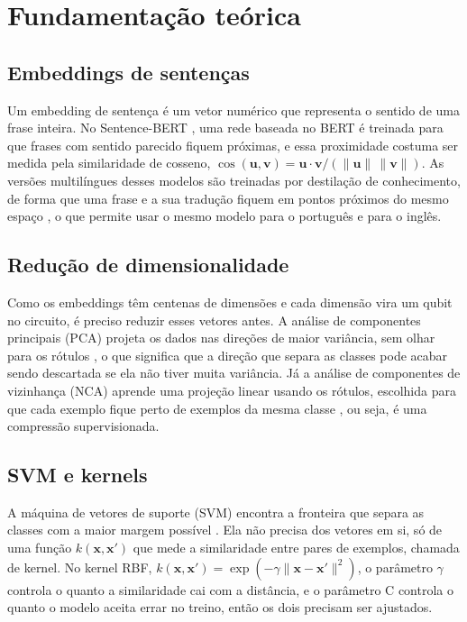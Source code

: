 \documentclass[conference]{IEEEtran}
\begin{document}
\section{Fundamentação teórica}
\label{sec:fundamentacao}

\subsection{Embeddings de sentenças}
Um embedding de sentença é um vetor numérico que representa o sentido de uma frase inteira. No Sentence-BERT \cite{reimers2019}, uma rede baseada no BERT é treinada para que frases com sentido parecido fiquem próximas, e essa proximidade costuma ser medida pela similaridade de cosseno, $\cos(\mathbf{u},\mathbf{v}) = \mathbf{u}\cdot\mathbf{v} / (\lVert\mathbf{u}\rVert\,\lVert\mathbf{v}\rVert)$. As versões multilíngues desses modelos são treinadas por destilação de conhecimento, de forma que uma frase e a sua tradução fiquem em pontos próximos do mesmo espaço \cite{reimers2020}, o que permite usar o mesmo modelo para o português e para o inglês.

\subsection{Redução de dimensionalidade}
Como os embeddings têm centenas de dimensões e cada dimensão vira um qubit no circuito, é preciso reduzir esses vetores antes. A análise de componentes principais (PCA) projeta os dados nas direções de maior variância, sem olhar para os rótulos \cite{jolliffe2002}, o que significa que a direção que separa as classes pode acabar sendo descartada se ela não tiver muita variância. Já a análise de componentes de vizinhança (NCA) aprende uma projeção linear usando os rótulos, escolhida para que cada exemplo fique perto de exemplos da mesma classe \cite{goldberger2004}, ou seja, é uma compressão supervisionada.

\subsection{SVM e kernels}
A máquina de vetores de suporte (SVM) encontra a fronteira que separa as classes com a maior margem possível \cite{cortes1995}. Ela não precisa dos vetores em si, só de uma função $k(\mathbf{x},\mathbf{x}')$ que mede a similaridade entre pares de exemplos, chamada de kernel. No kernel RBF, $k(\mathbf{x},\mathbf{x}') = \exp(-\gamma\lVert\mathbf{x}-\mathbf{x}'\rVert^2)$, o parâmetro $\gamma$ controla o quanto a similaridade cai com a distância, e o parâmetro C controla o quanto o modelo aceita errar no treino, então os dois precisam ser ajustados.
\end{document}
